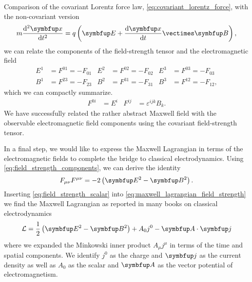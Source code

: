 Comparison of the covariant Lorentz force law, \cref{eq:covariant_lorentz_force}, with the non-covariant version
\begin{equation}
	m
	\odv[order={2}]{\vb{x}}{t}
	=
	q\left(
		\vb{E}
		+
		\odv{\vb{x}}{t}
		\vcross
		\vb{B}
	\right)
	\label{eq:lorentz_force}
	,
\end{equation}
we can relate the components of the field-strength tensor and the electromagnetic field~\cite[p.~245]{Zee2013}
\begin{align}
	E^1
	&=
	F^{01}
	=
	-
	F_{01}
	&
	E^2
	&=
	F^{02}
	=
	-
	F_{02}
	&
	E^3
	&=
	F^{03}
	=
	-
	F_{03}
	\\
	B^1
	&=
	F^{23}
	=
	-
	F_{23}
	&
	B^2
	&=
	F^{31}
	=
	-
	F_{31}
	&
	B^3
	&=
	F^{12}
	=
	-
	F_{12}
	,
\end{align}
which we can compactly summarize.~\cite[p.~336]{Srednicki2007}
\begin{align}
	F^{0i}
	&=
	E^i
	&
	F^{ij}
	&=
	\varepsilon^{ijk}
	B_k
	\label{eq:field_strength_components}
	.
\end{align}
We have successfully related the rather abstract Maxwell field with the observable electromagnetic field components using the covariant field-strength tensor.

In a final step, we would like to express the Maxwell Lagrangian in terms of the electromagnetic fields to complete the bridge to classical electrodynamics.
Using \cref{eq:field_strength_components}, we can derive the identity~\cite[p.~142]{Greiner2013}
\begin{equation}
	F_{\mu\nu}
	F^{\mu\nu}
	=
	-2
	\left(
		\vb{E}^2
		-
		\vb{B}^2
	\right)
	\label{eq:field_strength_scalar}
	.
\end{equation}
Inserting \cref{eq:field_strength_scalar} into \cref{eq:maxwell_lagrangian_field_strength} we find the Maxwell Lagrangian as reported in many books on classical electrodynamics
\begin{equation}
	\mathcal{L}
	=
	\frac{1}{2}
	\left(
		\vb{E}^2
		-
		\vb{B}^2
	\right)
	+
	A_0j^0
	-
	\vb{A}
	\vdot
	\vb{j}
\end{equation}
where we expanded the Minkowski inner product $A_\mu j^\mu$ in terms of the time and spatial components.
We identify $j^0$ as the charge and $\vb{j}$ as the current density as well as $A_0$ as the scalar and $\vb{A}$ as the vector potential of electromagnetism.

